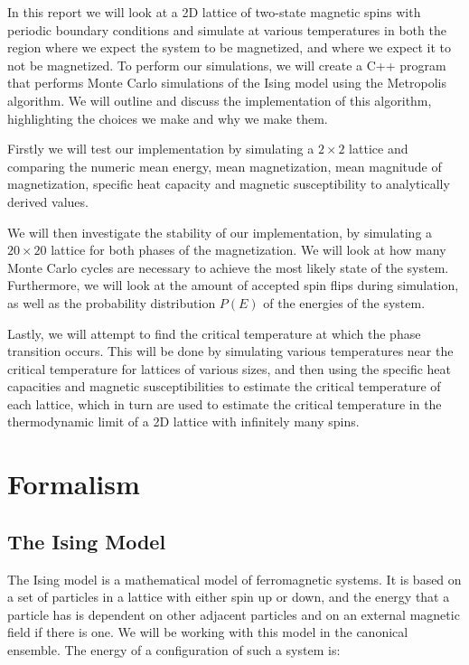 \documentclass[reprint,english,notitlepage]{revtex4-1}  %
\begin{document}
In this report we will look at a 2D lattice of two-state magnetic spins with periodic boundary conditions and simulate at various temperatures in both the region where we expect the system to be magnetized, and where we expect it to not be magnetized. To perform our simulations, we will create a C++ program that performs Monte Carlo simulations of the Ising model using the Metropolis algorithm. We will outline and discuss the implementation of this algorithm, highlighting the choices we make and why we make them.

Firstly we will test our implementation by simulating a \(2\times 2\) lattice and comparing the numeric mean energy, mean magnetization, mean magnitude of magnetization, specific heat capacity and magnetic susceptibility to analytically derived values.

We will then investigate the stability of our implementation, by simulating a \(20\times 20\) lattice for both phases of the magnetization. We will look at how many Monte Carlo cycles are necessary to achieve the most likely state of the system. Furthermore, we will look at the amount of accepted spin flips during simulation, as well as the probability distribution \(P(E)\) of the energies of the system.

Lastly, we will attempt to find the critical temperature at which the phase transition occurs. This will be done by simulating various temperatures near the critical temperature for lattices of various sizes, and then using the specific heat capacities and magnetic susceptibilities to estimate the critical temperature of each lattice, which in turn are used to estimate the critical temperature in the thermodynamic limit of a 2D lattice with infinitely many spins.


\newpage

\section{Formalism} \label{sec:II}

\subsection{The Ising Model} \label{sec:II:a}

The Ising model is a mathematical model of ferromagnetic systems. It is based on a set of particles in a lattice with either spin up or down, and the energy that a particle has is dependent on other adjacent particles and on an external magnetic field if there is one. We will be working with this model in the canonical ensemble. The energy of a configuration of such a system is:
\end{document}
